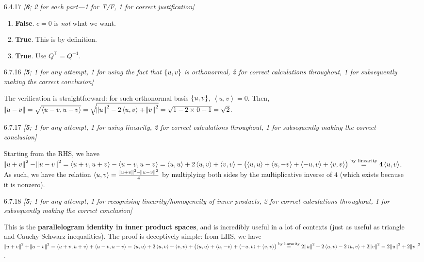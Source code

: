 \documentclass{amsart}
\theoremstyle{definition}
\theoremstyle{definition}
\DeclareMathOperator{\1}{\mathbbm{1}}
\newcommand{\innerproduct}[2]{\left\langle #1,#2 \right\rangle}
\begin{document}
\begin{enumerate}[itemsep = 2mm]
		
		\item[6.4.17] \textit{[\textbf{6}; 2 for each part---1 for T/F, 1 for correct justification]}
		
		\begin{enumerate}[label = (\alph*)]
			\item \textbf{False}. $c=0$ is \textit{not} what we want.
			
			\item \textbf{True}. This is by definition.
			
			\item \textbf{True}. Use $Q^{\intercal} = Q^{-1}$.
		\end{enumerate}
		
		
		\item[6.7.16] \textit{[\textbf{5}; 1 for any attempt, 1 for using the fact that $\set{u,v}$ is orthonormal, 2 for correct calculations throughout, 1 for subsequently making the correct conclusion]}
		
		The verification is straightforward: for such orthonormal basis $\set{u,v}$, $\innerproduct{u}{v} = 0$. Then, $\norm{u-v} = \sqrt{\innerproduct{u-v}{u-v}} = \sqrt{\norm{u}^2 - 2\innerproduct{u}{v} +\norm{v}^2} = \sqrt{1 - 2 \times 0 + 1} = \sqrt{2}$.
		
		\item[6.7.17] \textit{[\textbf{5}; 1 for any attempt, 1 for using linearity, 2 for correct calculations throughout, 1 for subsequently making the correct conclusion]}
		
		Starting from the RHS, we have $\norm{u+v}^2 - \norm{u-v}^2 = \innerproduct{u+v}{u+v} - \innerproduct{u-v}{u-v} = \innerproduct{u}{u} + 2 \innerproduct{u}{v} + \innerproduct{v}{v} - \left( \innerproduct{u}{u} + \innerproduct{u}{-v} + \innerproduct{-u}{v} + \innerproduct{v}{v} \right) \stackrel{\text{by linearity}}{=} 4 \innerproduct{u}{v}$. As such, we have the relation $\innerproduct{u}{v} = \frac{\norm{u+v}^2 - \norm{u-v}^2}{4}$ by multiplying both sides by the multiplicative inverse of $4$ (which exists because it is nonzero).
		
		\item[6.7.18] \textit{[\textbf{5}; 1 for any attempt, 1 for recognising linearity/homogeneity of inner products, 2 for correct calculations throughout, 1 for subsequently making the correct conclusion]}
		
		This is the \textbf{parallelogram identity in inner product spaces}, and is incredibly useful in a lot of contexts (just as useful as triangle and Cauchy-Schwarz inequalities). The proof is deceptively simple: from LHS, we have $\norm{u+v}^2 + \norm{u-v}^2 = \innerproduct{u+v}{u+v} + \innerproduct{u-v}{u-v} = \innerproduct{u}{u} + 2 \innerproduct{u}{v} + \innerproduct{v}{v} + \left( \innerproduct{u}{u} + \innerproduct{u}{-v} + \innerproduct{-u}{v} + \innerproduct{v}{v} \right) \stackrel{\text{by linearity}}{=} 2 \norm{u}^2 + 2 \innerproduct{u}{v} - 2 \innerproduct{u}{v} + 2 \norm{v}^2 = 2 \norm{u}^2 + 2 \norm{v}^2$.
		

\end{enumerate}
\end{document}
